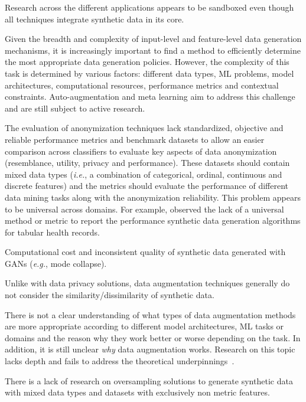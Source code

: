 \documentclass[parskip=full]{scrartcl}
\begin{document}
Research across the different applications appears to be sandboxed even though
all techniques integrate synthetic data in its core.

Given the breadth and complexity of input-level and feature-level data
generation mechanisms, it is increasingly important to find a method to
efficiently determine the most appropriate data generation policies. However,
the complexity of this task is determined by various factors: different data
types, ML problems, model architectures, computational resources, performance
metrics and contextual constraints. Auto-augmentation and meta learning aim to
address this challenge and are still subject to active research.

The evaluation of anonymization techniques lack standardized, objective and
reliable performance metrics and benchmark datasets to allow an easier
comparison across classifiers to evaluate key aspects of data anonymization
(resemblance, utility, privacy and performance). These datasets should contain
mixed data types (\textit{i.e.}, a combination of categorical, ordinal,
continuous and discrete features) and the metrics should evaluate the
performance of different data mining tasks along with the anonymization
reliability. This problem appears to be universal across domains. For example,
\citet{hernandez2022synthetic} observed the lack of a universal method or metric
to report the performance synthetic data generation algorithms for tabular
health records.

Computational cost and inconsistent quality of synthetic data generated with
GANs (\textit{e.g.}, mode collapse).

Unlike with data privacy solutions, data augmentation techniques generally do
not consider the similarity/dissimilarity of synthetic data.

There is not a clear understanding of what types of data augmentation methods
are more appropriate according to different model architectures, ML tasks or
domains and the reason why they work better or worse depending on the task. 
In addition, it is still unclear \textit{why} data augmentation works.
Research on this topic lacks depth and fails to address the theoretical
underpinnings~\cite{feng2021survey}.

There is a lack of research on oversampling solutions to generate synthetic
data with mixed data types and datasets with exclusively non metric features.

\end{document}
